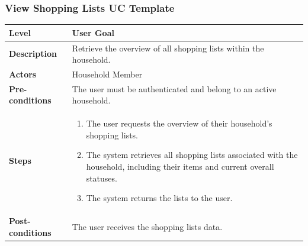 \subsubsection{View Shopping Lists UC Template}
\begin{longtable}{|p{3.5cm}|p{10.3cm}|}
\hline
\rowcolor{UCRow} \textbf{Level} & User Goal \\ \hline
\textbf{Description} & Retrieve the overview of all shopping lists within the household. \\ \hline
\rowcolor{UCRow} \textbf{Actors} & Household Member \\ \hline
\textbf{Pre-conditions} & The user must be authenticated and belong to an active household. \\ \hline
\rowcolor{UCRow} \textbf{Steps} &
\begin{enumerate}[nosep, leftmargin=*]
    \item The user requests the overview of their household's shopping lists.
    \item The system retrieves all shopping lists associated with the household, including their items and current overall statuses.
    \item The system returns the lists to the user.
\end{enumerate} \\ \hline
\textbf{Post-conditions} & The user receives the shopping lists data. \\ \hline
\end{longtable}

